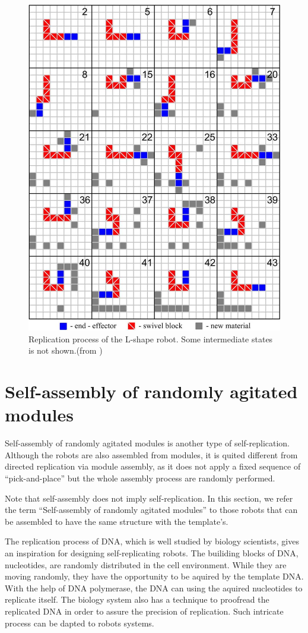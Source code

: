 \documentclass[12pt,twoside]{article}
\theoremstyle{plain}
\theoremstyle{definition}
\theoremstyle{remark}
\begin{document}
\begin{figure}[hbtp]
	 \centerline{\includegraphics[width=.6\textwidth]{zykov-279}}
	 {\caption{Replication process of the L-shape robot. Some intermediate states is not shown.(from \cite{zykov_evolved_2007})}
	 \label{fig:l-repproc}}
\end{figure}

\section{Self-assembly of randomly agitated modules}
\label{sec:random}

Self-assembly of randomly agitated modules is another type of self-replication. Although the robots are also assembled from modules, it is quited different from directed replication via module assembly, as it does not apply a fixed sequence of ``pick-and-place'' but the whole assembly process are randomly performed. 

Note that self-assembly does not imply self-replication. In this section, we refer the term ``Self-assembly of randomly agitated modules'' to those robots that can be assembled to have the same structure with the template's. 

The replication process of DNA, which is well studied by biology scientists, gives an inspiration for designing self-replicating robots. The builiding blocks of DNA, nucleotides, are randomly distributed in the cell environment. While they are moving randomly, they have the opportunity to be aquired by the template DNA. With the help of DNA polymerase, the DNA can using the aquired nucleotides to replicate itself. The biology system also has a technique to proofread the replicated DNA in order to assure the precision of replication\cite{alberts_molecular_2002}. Such intricate process can be dapted to robots systems.
\end{document}
